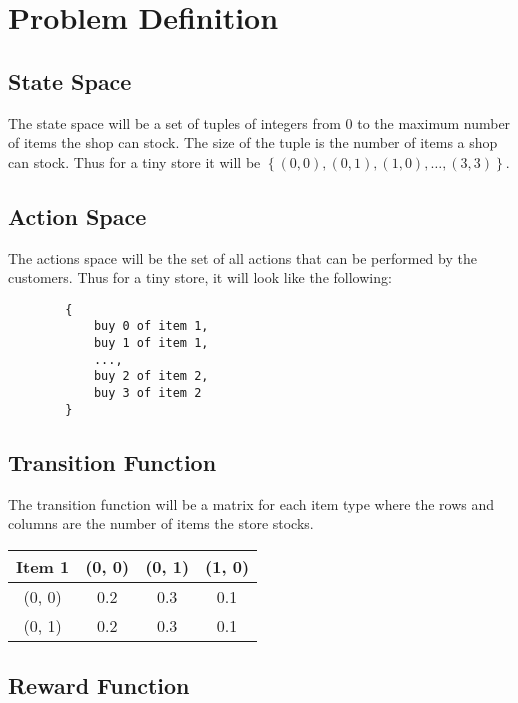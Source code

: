 \documentclass[12pt]{article}
\begin{document}
    \maketitle

    \section{Problem Definition}

    \subsection{State Space}
    The state space will be a set of tuples of integers from 0 to the maximum number of items the shop can stock. The size of the tuple is the number of items a shop can stock. 
    Thus for a tiny store it will be $\left\{(0, 0), (0, 1), (1, 0), \ldots, (3, 3)\right\}$.

    \subsection{Action Space}
    The actions space will be the set of all actions that can be performed by the customers. 
    Thus for a tiny store, it will look like the following:

    \begin{verbatim}
        {
            buy 0 of item 1,
            buy 1 of item 1,
            ...,
            buy 2 of item 2,
            buy 3 of item 2
        }
    \end{verbatim}

    \subsection{Transition Function}
    The transition function will be a matrix for each item type where the rows and columns are the number of items the store stocks.

    \begin{center}
        \begin{tabular} {|c|c|c|c|}
            \hline
            Item 1 & (0, 0) & (0, 1) & (1, 0) \\
            \hline
            (0, 0) & 0.2    & 0.3    & 0.1 \\
            (0, 1) & 0.2    & 0.3    & 0.1\\
            \hline
        \end{tabular}
    \end{center}

    \subsection{Reward Function}
\end{document}
